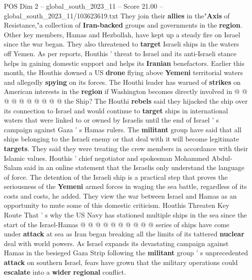 \begin{textsample}{POS Dim 2 – global\_south\_2023\_11 – Score 21.00 – global\_south\_2023\_11/103623619.txt}
They join their \textbf{allies} in the"\textbf{Axis} of Resistance,"a collection of \textbf{Iran-backed} groups and governments in the \textbf{region}.
Other key members, Hamas and Hezbollah, have kept up a steady fire on Israel since the war began.
They also threatened to \textbf{target} Israeli ships in the waters off Yemen.
As per reports, Houthis ' threat to Israel and its anti-Israeli stance helps in gaining domestic support and helps its \textbf{Iranian} benefactors.
Earlier this month, the Houthis downed a US \textbf{drone} flying above \textbf{Yemeni} territorial waters and allegedly \textbf{spying} on its forces.
The Houthi leader has warned of \textbf{strikes} on American interests in the \textbf{region} if Washington becomes directly involved in @ @ @ @ @ @ @ @ @ @ the Ship?
The Houthi \textbf{rebels} said they hijacked the ship over its connection to Israel and would continue to \textbf{target} ships in international waters that were linked to or owned by Israelis until the end of Israel ' s campaign against Gaza ' s Hamas rulers.
The \textbf{militant} group have said that all ships belonging to the Israeli enemy or that deal with it will become legitimate \textbf{targets}.
They said they were treating the crew members in accordance with their Islamic values.
Houthis ' chief negotiator and spokesman Mohammed Abdul-Salam said in an online statement that the Israelis only understand the language of force.
The detention of the Israeli ship is a practical step that proves the seriousness of the \textbf{Yemeni} armed forces in waging the sea battle, regardless of its costs and costs, he added.
They view the war between Israel and Hamas as an opportunity to mute some of this domestic criticism.
Houthis Threaten Key Route That ' s why the US Navy has stationed multiple ships in the sea since the start of the Israel-Hamas @ @ @ @ @ @ @ @ @ @ series of ships have come under \textbf{attack} at sea as Iran began breaking all the limits of its tattered \textbf{nuclear} deal with world powers.
As Israel expands its devastating campaign against Hamas in the besieged Gaza Strip following the \textbf{militant} group ' s unprecedented \textbf{attack} on southern Israel, fears have grown that the military operations could \textbf{escalate} into a \textbf{wider} \textbf{regional} conflict.

\end{textsample}
